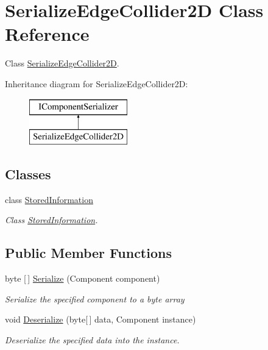 \hypertarget{class_serialize_edge_collider2_d}{}\section{Serialize\+Edge\+Collider2D Class Reference}
\label{class_serialize_edge_collider2_d}


Class \hyperlink{class_serialize_edge_collider2_d}{Serialize\+Edge\+Collider2D}.  


Inheritance diagram for Serialize\+Edge\+Collider2D\+:\begin{figure}[H]
\begin{center}
\leavevmode
\includegraphics[height=2.000000cm]{class_serialize_edge_collider2_d}
\end{center}
\end{figure}
\subsection*{Classes}
\begin{DoxyCompactItemize}
\item 
class \hyperlink{class_serialize_edge_collider2_d_1_1_stored_information}{Stored\+Information}
\begin{DoxyCompactList}\small\item\em Class \hyperlink{class_serialize_edge_collider2_d_1_1_stored_information}{Stored\+Information}. \end{DoxyCompactList}\end{DoxyCompactItemize}
\subsection*{Public Member Functions}
\begin{DoxyCompactItemize}
\item 
byte \mbox{[}$\,$\mbox{]} \hyperlink{class_serialize_edge_collider2_d_aa0efa9c04d2981e21c8d7a66003b1cf9}{Serialize} (Component component)
\begin{DoxyCompactList}\small\item\em Serialize the specified component to a byte array \end{DoxyCompactList}\item 
void \hyperlink{class_serialize_edge_collider2_d_a6abc37b6168840eaea4bf0bdbdc4c624}{Deserialize} (byte\mbox{[}$\,$\mbox{]} data, Component instance)
\begin{DoxyCompactList}\small\item\em Deserialize the specified data into the instance. \end{DoxyCompactList}\end{DoxyCompactItemize}


